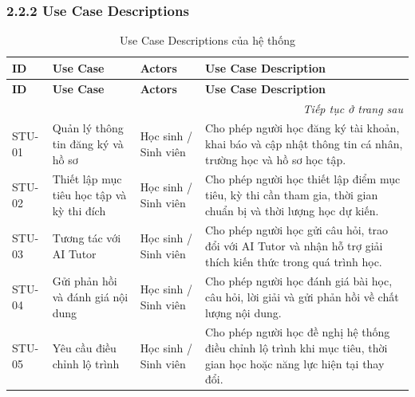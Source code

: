 \documentclass[12pt,a4paper,oneside]{report}
\begin{document}
\subsubsection*{2.2.2 Use Case Descriptions}
\label{subsubsec:use-case-descriptions}

\renewcommand{\arraystretch}{1.25}
\setlength{\tabcolsep}{5pt}
\small

\begin{longtable}{|p{}|p{}|p{}|p{}|}
\caption{Use Case Descriptions của hệ thống}
\label{tab:use-case-descriptions}\\
\hline
\rowcolor{orange!15}
\textbf{ID} & \textbf{Use Case} & \textbf{Actors} & \textbf{Use Case Description} \\
\hline
\endfirsthead

\hline
\rowcolor{orange!15}
\textbf{ID} & \textbf{Use Case} & \textbf{Actors} & \textbf{Use Case Description} \\
\hline
\endhead

\hline
\multicolumn{4}{r}{\textit{Tiếp tục ở trang sau}}\\
\endfoot

\hline
\endlastfoot

STU-01 &
Quản lý thông tin đăng ký và hồ sơ &
Học sinh / Sinh viên &
Cho phép người học đăng ký tài khoản, khai báo và cập nhật thông tin cá nhân, trường học và hồ sơ học tập. \\
\hline

STU-02 &
Thiết lập mục tiêu học tập và kỳ thi đích &
Học sinh / Sinh viên &
Cho phép người học thiết lập điểm mục tiêu, kỳ thi cần tham gia, thời gian chuẩn bị và thời lượng học dự kiến. \\
\hline

STU-03 &
Tương tác với AI Tutor &
Học sinh / Sinh viên &
Cho phép người học gửi câu hỏi, trao đổi với AI Tutor và nhận hỗ trợ giải thích kiến thức trong quá trình học. \\
\hline

STU-04 &
Gửi phản hồi và đánh giá nội dung &
Học sinh / Sinh viên &
Cho phép người học đánh giá bài học, câu hỏi, lời giải và gửi phản hồi về chất lượng nội dung. \\
\hline

STU-05 &
Yêu cầu điều chỉnh lộ trình &
Học sinh / Sinh viên &
Cho phép người học đề nghị hệ thống điều chỉnh lộ trình khi mục tiêu, thời gian học hoặc năng lực hiện tại thay đổi. \\
\hline


\end{longtable}
\end{document}
